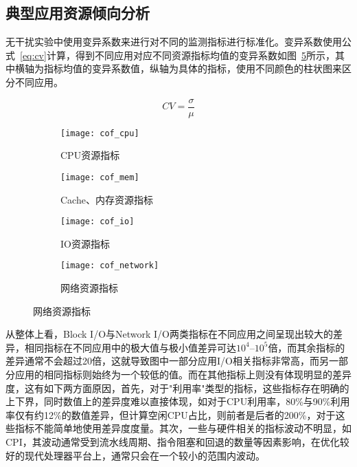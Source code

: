 



\subsection{典型应用资源倾向分析}

无干扰实验中使用变异系数来进行对不同的监测指标进行标准化。变异系数使用公式~\eqref{eq:cv}计算，得到不同应用对应不同资源指标均值的变异系数如图~\ref{fig:resource_affinity}所示，其中横轴为指标均值的变异系数值，纵轴为具体的指标，使用不同颜色的柱状图来区分不同应用。

\begin{equation}
    CV = \frac{\sigma}{\mu}
\label{eq:cv}
\end{equation}

\begin{figure}[H]
    \centering
    \begin{subfigure}[b]{0.49\textwidth}
      \texttt{[image: cof\_cpu]}
      \caption{CPU资源指标}
      \label{fig:cof_cpu}
    \end{subfigure}
    \begin{subfigure}[b]{0.49\textwidth}
        \texttt{[image: cof\_mem]}
        \caption{Cache、内存资源指标}
        \label{fig:cof_mem}
    \end{subfigure}
    \begin{subfigure}[b]{0.49\textwidth}
        \texttt{[image: cof\_io]}
        \caption{IO资源指标}
        \label{fig:cof_mem}
    \end{subfigure}
    \begin{subfigure}[b]{0.49\textwidth}
        \texttt{[image: cof\_network]}
        \caption{网络资源指标}
        \label{fig:cof_mem}
    \end{subfigure}
\label{fig:resource_affinity}
\end{figure}

从整体上看，Block I/O与Network I/O两类指标在不同应用之间呈现出较大的差异，相同指标在不同应用中的极大值与极小值差异可达$10^4$--$10^5$倍，而其余指标的差异通常不会超过20倍，这就导致图中一部分应用I/O相关指标非常高，而另一部分应用的相同指标则始终为一个较低的值。而在其他指标上则没有体现明显的差异度，这有如下两方面原因，首先，对于"利用率"类型的指标，这些指标存在明确的上下界，同时数值上的差异度难以直接体现，如对于CPU利用率，80\%与90\%利用率仅有约12\%的数值差异，但计算空闲CPU占比，则前者是后者的200\%，对于这些指标不能简单地使用差异度度量。其次，一些与硬件相关的指标波动不明显，如CPI，其波动通常受到流水线周期、指令阻塞和回退的数量等因素影响，在优化较好的现代处理器平台上，通常只会在一个较小的范围内波动。

